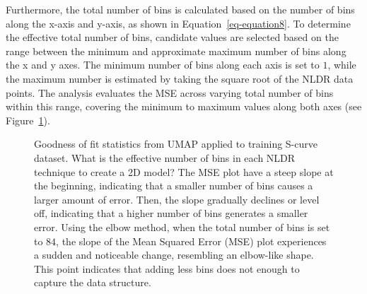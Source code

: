 \documentclass[
  12pt]{article}
\begin{document}
Furthermore, the total number of bins is calculated based on the number
of bins along the x-axis and y-axis, as shown in
Equation~\ref{eq-equation8}. To determine the effective total number of
bins, candidate values are selected based on the range between the
minimum and approximate maximum number of bins along the x and y axes.
The minimum number of bins along each axis is set to \(1\), while the
maximum number is estimated by taking the square root of the NLDR data
points. The analysis evaluates the MSE across varying total number of
bins within this range, covering the minimum to maximum values along
both axes (see Figure~\ref{fig-diagnosticpltScurve}).

\begin{figure}


\caption{\label{fig-diagnosticpltScurve}Goodness of fit statistics from
UMAP applied to training S-curve dataset. What is the effective number
of bins in each NLDR technique to create a 2D model? The MSE plot have a
steep slope at the beginning, indicating that a smaller number of bins
causes a larger amount of error. Then, the slope gradually declines or
level off, indicating that a higher number of bins generates a smaller
error. Using the elbow method, when the total number of bins is set to
\(84\), the slope of the Mean Squared Error (MSE) plot experiences a
sudden and noticeable change, resembling an elbow-like shape. This point
indicates that adding less bins does not enough to capture the data
structure.}

\end{figure}%
\end{document}
